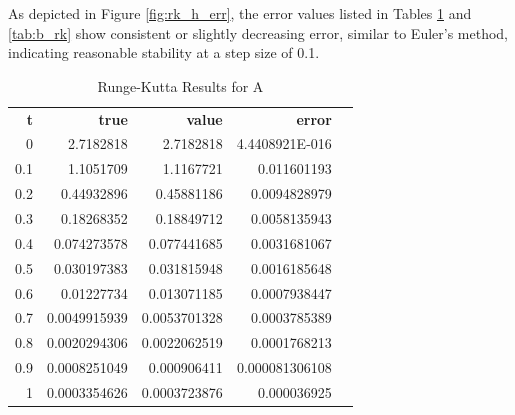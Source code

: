 \documentclass{article}
\begin{document}
As depicted in Figure \ref{fig:rk_h_err}, the error values listed in Tables \ref{tab:a_rk} and \ref{tab:b_rk} show consistent or slightly decreasing error, similar to Euler's method, indicating reasonable stability at a step size of 0.1.

\begin{table}[H]
\footnotesize
\centering
\caption{Runge-Kutta Results for A}
\label{tab:a_rk}
\begin{tabular}{rrrrl}
\textbf{t} & \textbf{true} & \textbf{value} & \textbf{error} &  \\
0          & 2.7182818     & 2.7182818      & 4.4408921E-016 &  \\
0.1        & 1.1051709     & 1.1167721      & 0.011601193    &  \\
0.2        & 0.44932896    & 0.45881186     & 0.0094828979   &  \\
0.3        & 0.18268352    & 0.18849712     & 0.0058135943   &  \\
0.4        & 0.074273578   & 0.077441685    & 0.0031681067   &  \\
0.5        & 0.030197383   & 0.031815948    & 0.0016185648   &  \\
0.6        & 0.01227734    & 0.013071185    & 0.0007938447   &  \\
0.7        & 0.0049915939  & 0.0053701328   & 0.0003785389   &  \\
0.8        & 0.0020294306  & 0.0022062519   & 0.0001768213   &  \\
0.9        & 0.0008251049  & 0.000906411    & 0.000081306108 &  \\
1          & 0.0003354626  & 0.0003723876   & 0.000036925    
\end{tabular}
\end{table}
\end{document}
